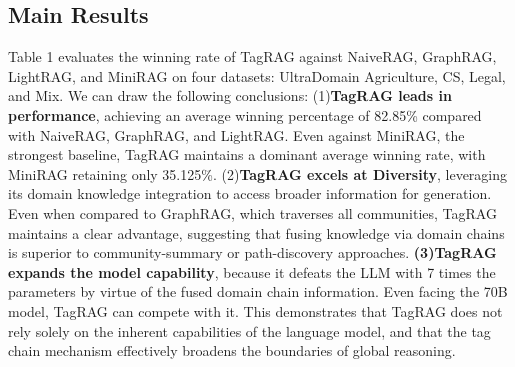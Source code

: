 \documentclass[11pt]{article}
\newcommand{\twbadd}[1]{\textcolor[HTML]{006AEB}{#1}}
\begin{document}

\subsection{Main Results} 
Table 1 evaluates the winning rate of TagRAG against NaiveRAG, GraphRAG, LightRAG, and MiniRAG on four datasets: UltraDomain Agriculture, CS, Legal, and Mix. We can draw the following conclusions: (1)\textbf{TagRAG leads in performance}, achieving an average winning percentage of 82.85\% compared with NaiveRAG, GraphRAG, and LightRAG. Even against MiniRAG, the strongest baseline, TagRAG maintains a dominant average winning rate, with MiniRAG retaining only 35.125\%. (2)\textbf{TagRAG excels at Diversity}, leveraging its domain knowledge integration to access broader information for generation. Even when compared to GraphRAG, which traverses all communities, TagRAG maintains a clear advantage, suggesting that fusing knowledge via domain chains is superior to community-summary or path-discovery approaches. \textbf{(3)TagRAG expands the model capability}, because it defeats the LLM with 7 times the parameters by virtue of the fused domain chain information. Even facing the 70B model, TagRAG can compete with it. This demonstrates that TagRAG does not rely solely on the inherent capabilities of the language model, and that the tag chain mechanism effectively broadens the boundaries of global reasoning.
\end{document}
